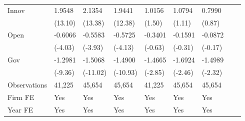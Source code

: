 \begin{table}[htbp]
\begin{tabularx}{\textwidth}{lYYYYYYYY@{}}
Innov           &   1.9548\sym{***}&   2.1354\sym{***}&   1.9441\sym{***}&   1.0156         &   1.0794         &   0.7990         \\
                &  (13.10)         &  (13.38)         &  (12.38)         &   (1.50)         &   (1.11)         &   (0.87)         \\
Open            &  -0.6066\sym{***}&  -0.5583\sym{***}&  -0.5725\sym{***}&  -0.3401         &  -0.1591         &  -0.0872         \\
                &  (-4.03)         &  (-3.93)         &  (-4.13)         &  (-0.63)         &  (-0.31)         &  (-0.17)         \\
Gov             &  -1.2981\sym{***}&  -1.5068\sym{***}&  -1.4900\sym{***}&  -1.4665\sym{***}&  -1.6924\sym{**} &  -1.4989\sym{**} \\
                &  (-9.36)         & (-11.02)         & (-10.93)         &  (-2.85)         &  (-2.46)         &  (-2.32)         \\
\hline
Observations    &   41,225         &   45,654         &   45,654         &   41,225         &   45,654         &   45,654         \\
Firm FE         &      Yes         &      Yes         &      Yes         &      Yes         &      Yes         &      Yes         \\
Year FE         &      Yes         &      Yes         &      Yes         &      Yes         &      Yes         &      Yes         \\
\bottomrule
\end{tabularx}
\end{table}
